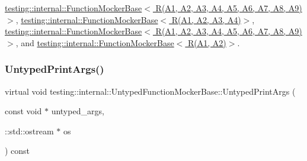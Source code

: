 \hyperlink{classtesting_1_1internal_1_1_function_mocker_base_aed1c6248ba1b50437ee3a5f72c5f7bf3}{testing\+::internal\+::\+Function\+Mocker\+Base$<$ R(\+A1, A2, A3, A4, A5, A6, A7, A8, A9)$>$}, \hyperlink{classtesting_1_1internal_1_1_function_mocker_base_aed1c6248ba1b50437ee3a5f72c5f7bf3}{testing\+::internal\+::\+Function\+Mocker\+Base$<$ R(\+A1, A2, A3, A4)$>$}, \hyperlink{classtesting_1_1internal_1_1_function_mocker_base_aed1c6248ba1b50437ee3a5f72c5f7bf3}{testing\+::internal\+::\+Function\+Mocker\+Base$<$ R(\+A1, A2, A3, A4, A5, A6, A7, A8, A9) $>$}, and \hyperlink{classtesting_1_1internal_1_1_function_mocker_base_aed1c6248ba1b50437ee3a5f72c5f7bf3}{testing\+::internal\+::\+Function\+Mocker\+Base$<$ R(\+A1, A2)$>$}.

\mbox{\label{classtesting_1_1internal_1_1_untyped_function_mocker_base_ae8c91f05fc90e66a84df49aae8de0d41}} 
\subsubsection{\texorpdfstring{Untyped\+Print\+Args()}{UntypedPrintArgs()}}
{\footnotesize\ttfamily virtual void testing\+::internal\+::\+Untyped\+Function\+Mocker\+Base\+::\+Untyped\+Print\+Args (\begin{DoxyParamCaption}\item[{const void $\ast$}]{untyped\+\_\+args,  }\item[{\+::std\+::ostream $\ast$}]{os }\end{DoxyParamCaption}) const\hspace{0.3cm}{\ttfamily [pure virtual]}}

\mbox{\label{classtesting_1_1internal_1_1_untyped_function_mocker_base_a3f1d62a1662a3daa2895b3af963be269}} 
